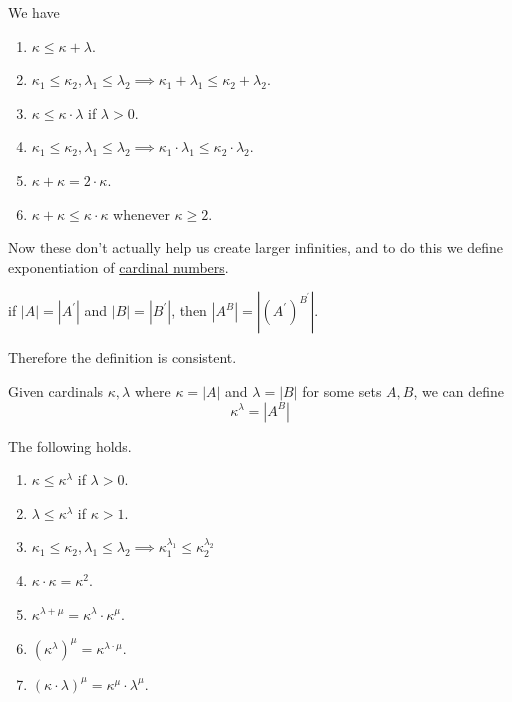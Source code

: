   \begin{theorem}[Inequalities]
    \label{thm:inequalities}
    We have 
    \begin{enumerate}
      \item $\kappa \leq \kappa + \lambda$. 
      \item $\kappa_1 \leq \kappa_2, \lambda_1 \leq \lambda_2 \implies \kappa_1 + \lambda_1 \leq \kappa_2 + \lambda_2$. 
      \item $\kappa \leq \kappa \cdot \lambda$ if $\lambda > 0$. 
      \item $\kappa_1 \leq \kappa_2, \lambda_1 \leq \lambda_2 \implies \kappa_1 \cdot \lambda_1 \leq \kappa_2 \cdot \lambda_2$. 
      \item $\kappa + \kappa = 2 \cdot \kappa$. 
      \item $\kappa + \kappa \leq \kappa \cdot \kappa$ whenever $\kappa \geq 2$. 
    \end{enumerate}
  \end{theorem} 

  Now these don't actually help us create larger infinities, and to do this we define exponentiation of \hyperref[def:cardinal-numbers]{cardinal numbers}. 

  \begin{lemma}
    \label{thm:well-definedness-of-cardinal-exponentiation}
 
    if $|A| = |A^\prime|$ and $|B| = |B^\prime|$, then $|A^B| = |(A^\prime)^{B^\prime}|$. 
  \end{lemma}

  Therefore the definition is consistent. 

  \begin{definition}
    \label{def:exponentiation-of-cardinals}
    Given cardinals $\kappa, \lambda$ where $\kappa = |A|$ and $\lambda = |B|$ for some sets $A, B$, we can define 
    \begin{equation}
      \kappa^{\lambda} = |A^B|
    \end{equation}
  \end{definition}

  \begin{theorem}
    \label{thm:properties-of-exponentiation}
    The following holds. 
    \begin{enumerate}
      \item $\kappa \leq \kappa^\lambda$ if $\lambda > 0$. 
      \item $\lambda \leq \kappa^\lambda$ if $\kappa > 1$.  
      \item $\kappa_1 \leq \kappa_2, \lambda_1 \leq \lambda_2 \implies \kappa_1^{\lambda_1} \leq \kappa_2^{\lambda_2}$ 
      \item $\kappa \cdot \kappa = \kappa^2$. 
      \item $\kappa^{\lambda + \mu} = \kappa^\lambda \cdot \kappa^\mu$. 
      \item $(\kappa^{\lambda})^\mu = \kappa^{\lambda \cdot \mu}$. 
      \item $(\kappa \cdot \lambda)^\mu = \kappa^\mu \cdot \lambda^\mu$. 
    \end{enumerate}
  \end{theorem} 

